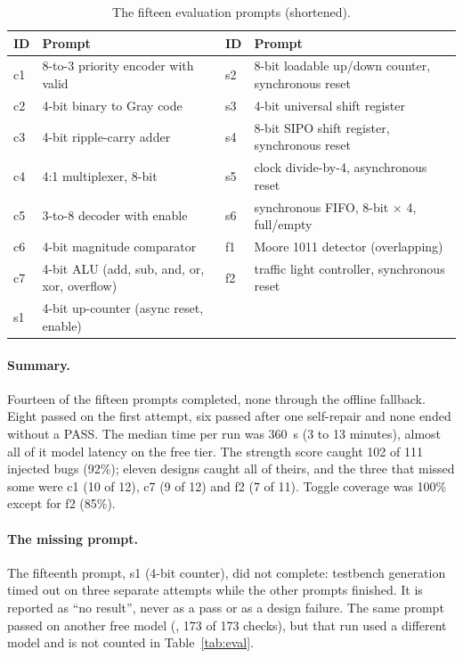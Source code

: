 \begin{table}[H]
\centering
\caption{The fifteen evaluation prompts (shortened).}
\label{tab:evalprompts}
\footnotesize
\begin{tabularx}{\textwidth}{@{}l X l X@{}}
\toprule
\textbf{ID} & \textbf{Prompt} & \textbf{ID} & \textbf{Prompt} \\
\midrule
c1 & 8-to-3 priority encoder with valid & s2 & 8-bit loadable up/down counter, synchronous reset \\
c2 & 4-bit binary to Gray code & s3 & 4-bit universal shift register \\
c3 & 4-bit ripple-carry adder & s4 & 8-bit SIPO shift register, synchronous reset \\
c4 & 4:1 multiplexer, 8-bit & s5 & clock divide-by-4, asynchronous reset \\
c5 & 3-to-8 decoder with enable & s6 & synchronous FIFO, 8-bit $\times$ 4, full/empty \\
c6 & 4-bit magnitude comparator & f1 & Moore 1011 detector (overlapping) \\
c7 & 4-bit ALU (add, sub, and, or, xor, overflow) & f2 & traffic light controller, synchronous reset \\
s1 & 4-bit up-counter (async reset, enable) & & \\
\bottomrule
\end{tabularx}
\end{table}

\paragraph{Summary.} Fourteen of the fifteen prompts completed, none through the
offline fallback. Eight passed on the first attempt, six passed after one self-repair
and none ended without a PASS. The median time per run was 360~s (3 to 13 minutes),
almost all of it model latency on the free tier. The strength score caught 102 of 111
injected bugs (92\%); eleven designs caught all of theirs, and the three that missed
some were c1 (10 of 12), c7 (9 of 12) and f2 (7 of 11). Toggle coverage was 100\%
except for f2 (85\%).

\paragraph{The missing prompt.} The fifteenth prompt, s1 (4-bit counter), did not
complete: testbench generation timed out on three separate attempts while the other
prompts finished. It is reported as ``no result'', never as a pass or as a design
failure. The same prompt passed on another free model
(, 173 of 173 checks), but that run used a different
model and is not counted in Table~\ref{tab:eval}.

